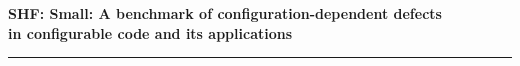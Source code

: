\documentclass[11pt]{article}
\begin{document}
\begin{center}
{\large \bf SHF: Small: A benchmark of configuration-dependent defects\\ in configurable code and its applications}
\end{center}
\vspace{-.1in}
\hrule

%

%


%
%


%



%


\newpage
\setcounter{page}{1}





\end{document}
